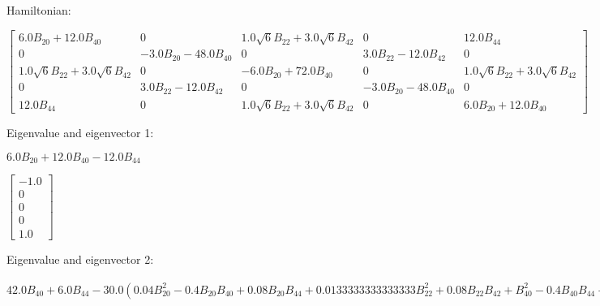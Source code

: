 \documentclass[8pt]{report}
\begin{document}
Hamiltonian:

\begin{math}
\left[\begin{matrix}6.0 B_{20} + 12.0 B_{40} & 0 & 1.0 \sqrt{6} B_{22} + 3.0 \sqrt{6} B_{42} & 0 & 12.0 B_{44}\\0 & - 3.0 B_{20} - 48.0 B_{40} & 0 & 3.0 B_{22} - 12.0 B_{42} & 0\\1.0 \sqrt{6} B_{22} + 3.0 \sqrt{6} B_{42} & 0 & - 6.0 B_{20} + 72.0 B_{40} & 0 & 1.0 \sqrt{6} B_{22} + 3.0 \sqrt{6} B_{42}\\0 & 3.0 B_{22} - 12.0 B_{42} & 0 & - 3.0 B_{20} - 48.0 B_{40} & 0\\12.0 B_{44} & 0 & 1.0 \sqrt{6} B_{22} + 3.0 \sqrt{6} B_{42} & 0 & 6.0 B_{20} + 12.0 B_{40}\end{matrix}\right]
\end{math}

Eigenvalue and eigenvector 1:

\begin{math}
6.0 B_{20} + 12.0 B_{40} - 12.0 B_{44}
\end{math}

\begin{math}
\left[\begin{matrix}-1.0\\0\\0\\0\\1.0\end{matrix}\right]
\end{math}

Eigenvalue and eigenvector 2:

\begin{math}
42.0 B_{40} + 6.0 B_{44} - 30.0 \left(0.04 B_{20}^{2} - 0.4 B_{20} B_{40} + 0.08 B_{20} B_{44} + 0.0133333333333333 B_{22}^{2} + 0.08 B_{22} B_{42} + B_{40}^{2} - 0.4 B_{40} B_{44} + 0.12 B_{42}^{2} + 0.04 B_{44}^{2}\right)^{0.5}
\end{math}
\end{document}
